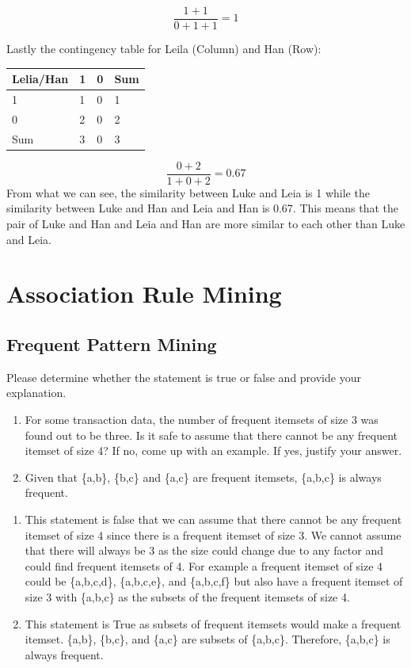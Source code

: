 \documentclass{article}
\begin{document}
\[\frac{1 + 1}{0 + 1 + 1} = 1\]

\noindent
\newpage
Lastly the contingency table for Leila (Column) and Han (Row):

\begin{table}[h]
    \begin{tabular}{|l|l|l|l|}
    \hline
    Lelia/Han & 1 & 0 & Sum \\ \hline
    1 & 1 & 0 & 1 \\ \hline
    0 & 2 & 0 & 2 \\ \hline
    Sum & 3 & 0 & 3 \\ \hline
    \end{tabular}
    \centering
\end{table}

\[\frac{0 + 2}{1 + 0 + 2} = 0.67\]
\noindent
From what we can see, the similarity between Luke and Leia is 1 while the similarity between Luke and Han and Leia and Han is 0.67. This means that the pair of Luke and Han and Leia and Han are more similar to each other than Luke and Leia.

\section{Association Rule Mining}

\subsection*{Frequent Pattern Mining}

Please determine whether the statement is true or false and provide your explanation.

\begin{enumerate}
    \item For some transaction data, the number of frequent itemsets of size 3 was found out to be three. Is it safe to assume that there cannot be any frequent itemset of size 4? If no, come up with an example. If yes, justify your answer.
    \item Given that \{a,b\}, \{b,c\} and \{a,c\} are frequent itemsets, \{a,b,c\} is always frequent.
\end{enumerate}

\begin{enumerate}
    \item This statement is false that we can assume that there cannot be any frequent itemset of size 4 since there is a frequent itemset of size 3. We cannot assume that there will always be 3 as the size could change due to any factor and could find frequent itemsets of 4. For example a frequent itemset of size 4 could be \{a,b,c,d\}, \{a,b,c,e\}, and \{a,b,c,f\} but also have a frequent itemset of size 3 with \{a,b,c\} as the subsets of the frequent itemsets of size 4. 
    \item This statement is True as subsets of frequent itemsets would make a frequent itemset. \{a,b\}, \{b,c\}, and \{a,c\} are subsets of \{a,b,c\}. Therefore, \{a,b,c\} is always frequent.
\end{enumerate}
\newpage
\end{document}
